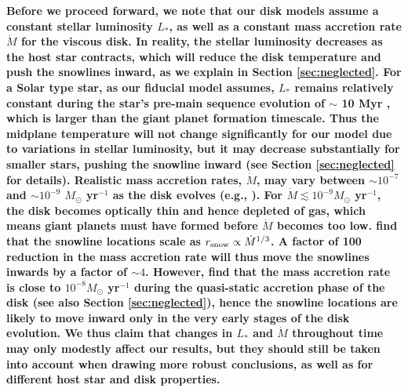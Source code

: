 \documentclass[apj]{emulateapj}
\begin{document}
\textbf{Before we proceed forward, we note that our disk models assume a constant stellar luminosity $L_*$, as well as a constant mass accretion rate $\dot{M}$ for the viscous disk. In reality, the stellar luminosity decreases as the host star contracts, which will reduce the disk temperature and push the snowlines inward, as we explain in Section \ref{sec:neglected}. For a Solar type star, as our fiducial model assumes, $L_*$ remains relatively constant during the star's pre-main sequence evolution of $\sim$ 10 Myr \citep{kennedy06}, which is larger than the giant planet formation timescale. Thus the midplane temperature will not change significantly for our model due to variations in stellar luminosity, but it may decrease substantially for smaller stars, pushing the snowline inward (see Section \ref{sec:neglected} for details). Realistic mass accretion rates, $\dot{M}$, may vary between $\sim$$10^{-7}$ and $\sim$$10^{-9}$ $M_{\odot}$ yr$^{-1}$ as the disk evolves (e.g., \citealt{garaud07}). For $\dot{M}\lesssim 10^{-9} M_{\odot}$ yr$^{-1}$, the disk becomes optically thin and hence depleted of gas, which means giant planets must have formed before $\dot{M}$ becomes too low. \citet{garaud07} find that the snowline locations scale as $r_{\rm snow} \propto \dot{M}^{1/3}$. A factor of 100 reduction in the mass accretion rate will thus move the snowlines inwards by a factor of $\sim$$4$. However, \citet{garaud07} find that the mass accretion rate is close to $10^{-8} M_{\odot}$ yr$^{-1}$ during the quasi-static accretion phase of the disk (see also Section \ref{sec:neglected}), hence the snowline locations are likely to move inward only in the very early stages of the disk evolution. We thus claim that changes in $L_*$ and $\dot{M}$ throughout time may only modestly affect our results, but they should still be taken into account when drawing more robust conclusions, as well as for different host star and disk properties.}


\end{document}
